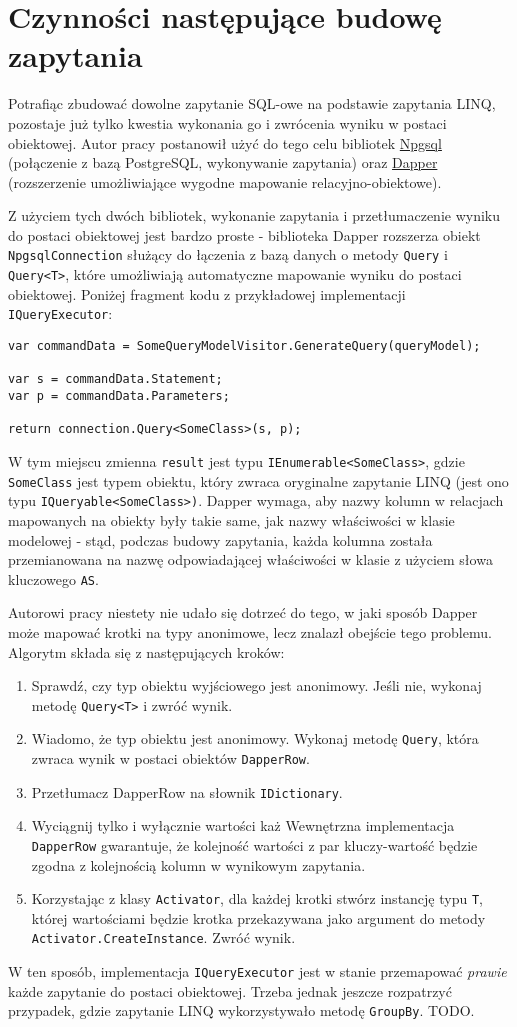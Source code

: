 \section{Czynności następujące budowę zapytania}
Potrafiąc zbudować dowolne zapytanie SQL-owe na podstawie zapytania LINQ, pozostaje już tylko kwestia wykonania go i zwrócenia wyniku w postaci obiektowej. Autor pracy postanowił użyć do tego celu bibliotek \href{}{Npgsql} (połączenie z bazą PostgreSQL, wykonywanie zapytania) oraz \href{}{Dapper} (rozszerzenie umożliwiające wygodne mapowanie relacyjno-obiektowe).

Z użyciem tych dwóch bibliotek, wykonanie zapytania i przetłumaczenie wyniku do postaci obiektowej jest bardzo proste - biblioteka Dapper rozszerza obiekt \texttt{NpgsqlConnection} służący do łączenia z bazą danych o metody \texttt{Query} i \texttt{Query<T>}, które umożliwiają automatyczne mapowanie wyniku do postaci obiektowej. Poniżej fragment kodu z przykładowej implementacji \texttt{IQueryExecutor}:

\begin{lstlisting}
var commandData = SomeQueryModelVisitor.GenerateQuery(queryModel);

var s = commandData.Statement;
var p = commandData.Parameters;

return connection.Query<SomeClass>(s, p);
\end{lstlisting}

W tym miejscu zmienna \texttt{result} jest typu \texttt{IEnumerable<SomeClass>}, gdzie \texttt{SomeClass} jest typem obiektu, który zwraca oryginalne zapytanie LINQ (jest ono typu \texttt{IQueryable<SomeClass>)}. Dapper wymaga, aby nazwy kolumn w relacjach mapowanych na obiekty były takie same, jak nazwy właściwości w klasie modelowej - stąd, podczas budowy zapytania, każda kolumna została przemianowana na nazwę odpowiadającej właściwości w klasie z użyciem słowa kluczowego \texttt{AS}.

Autorowi pracy niestety nie udało się dotrzeć do tego, w jaki sposób Dapper może mapować krotki na typy anonimowe, lecz znalazł obejście tego problemu. Algorytm składa się z następujących kroków:

\begin{enumerate}
\item Sprawdź, czy typ obiektu wyjściowego jest anonimowy. Jeśli nie, wykonaj metodę \texttt{Query<T>} i zwróć wynik.
\item Wiadomo, że typ obiektu jest anonimowy. Wykonaj metodę \texttt{Query}, która zwraca wynik w postaci obiektów \texttt{DapperRow}. 
\item Przetłumacz DapperRow na słownik \texttt{IDictionary}.
\item Wyciągnij tylko i wyłącznie wartości każ Wewnętrzna implementacja \texttt{DapperRow} gwarantuje, że kolejność wartości z par kluczy-wartość będzie zgodna z kolejnością kolumn w wynikowym zapytania.
\item Korzystając z klasy \texttt{Activator}, dla każdej krotki stwórz instancję typu \texttt{T}, której wartościami będzie krotka przekazywana jako argument do metody \texttt{Activator.CreateInstance}. Zwróć wynik.
\end{enumerate}

W ten sposób, implementacja \texttt{IQueryExecutor} jest w stanie przemapować \textit{prawie} każde zapytanie do postaci obiektowej. Trzeba jednak jeszcze rozpatrzyć przypadek, gdzie zapytanie LINQ wykorzystywało metodę \texttt{GroupBy}. TODO.